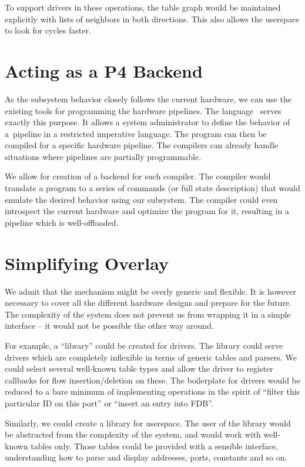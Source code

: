 To support drivers in these operations, the table graph would be maintained
explicitly with lists of neighbors in both directions. This also allows the
userspace to look for cycles faster.

\section{Acting as a P4 Backend}

As the subsystem behavior closely follows the current hardware, we can use the existing
tools for programming the hardware pipelines. The  language~\cite{P4} serves exactly
this purpose. It allows a system administrator to define the behavior of
a~pipeline in a restricted imperative language. The program can then be compiled
for a specific hardware pipeline. The compilers can already handle situations
where pipelines are partially programmable.

We allow for creation of a backend for such compiler. The compiler would
translate a  program to a series of commands (or full state description) that
would emulate the desired behavior using our subsystem. The compiler could even
introspect the current hardware and optimize the program for it, resulting in
a pipeline which is well-offloaded.

\section{Simplifying Overlay}

We admit that the mechanism might be overly generic and flexible. It is however
necessary to cover all the different hardware designs and prepare for the
future. The complexity of the system does not prevent us from wrapping it in
a simple interface -- it would not be possible the other way around.

For example, a ``library'' could be created for drivers. The library could
serve drivers which are completely inflexible in terms of generic tables and
parsers. We could select several well-known table types and allow the driver to
register callbacks for flow insertion/deletion on these. The boilerplate for
drivers would be reduced to a bare minimum of implementing operations in the spirit
of ``filter this particular  ID on this port'' or ``insert an entry
into FDB''.

Similarly, we could create a library for userspace. The user of the library
would be abstracted from the complexity of the system, and would work with
well-known tables only. Those tables could be provided with a sensible
interface, understanding how to parse and display addresses, ports, constants
and so on.

